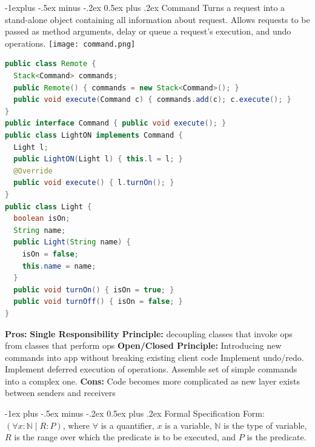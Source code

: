 \documentclass[letterpaper, 8pt]{extarticle}
\makeatletter
\renewcommand{\section}{\@startsection{section}{1}{0mm}%
                                {-1ex plus -.5ex minus -.2ex}%
                                {0.5ex plus .2ex}%
                                {\normalfont\normalsize\bfseries}}
\renewcommand{\subsection}{\@startsection{subsection}{2}{0mm}%
                                {-1explus -.5ex minus -.2ex}%
                                {0.5ex plus .2ex}%
                                {\normalfont\small\bfseries}}
\makeatother
\begin{document}
\begin{multicols*}{5}
  \subsection{Command}
  Turns a request into a stand-alone object containing all information about request.
  Allows requests to be passed as method arguments, delay or queue a request's execution, and undo operations.
  \texttt{[image: command.png]}
    \begin{lstlisting}[language=Java, breaklines=true]
public class Remote {
  Stack<Command> commands;
  public Remote() { commands = new Stack<Command>(); }
  public void execute(Command c) { commands.add(c); c.execute(); } 
}
public interface Command { public void execute(); }
public class LightON implements Command {
  Light l;
  public LightON(Light l) { this.l = l; }
  @Override
  public void execute() { l.turnOn(); }
}
public class Light {
  boolean isOn;
  String name;
  public Light(String name) {
    isOn = false;
    this.name = name;
  }
  public void turnOn() { isOn = true; }
  public void turnOff() { isOn = false; }
}
    \end{lstlisting}
  \textbf{Pros:} \textbf{Single Responsibility Principle:} decoupling classes that invoke ops from classes that perform ops
  \textbf{Open/Closed Principle:} Introducing new commands into app without breaking existing client code
  Implement undo/redo.
  Implement deferred execution of operations.
  Assemble set of simple commands into a complex one.
  \textbf{Cons:} Code becomes more complicated as new layer exists between senders and receivers

  \section{Formal Specification}
  Form: $(\forall x : \mathbb{N} \mid R : P)$,
  where $\forall$ is a quantifier, $x$ is a variable, $\mathbb{N}$ is the type of variable,
  $R$ is the range over which the predicate is to be executed, and $P$ is the predicate.


\end{multicols*}
\end{document}
